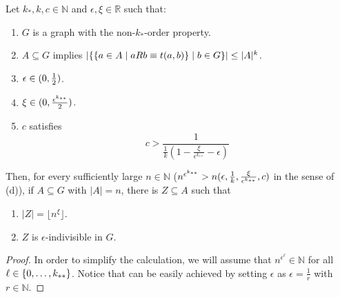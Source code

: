     \begin{lemma}[Claim 4.21] \label{lem:many_values_to_equitative_partition_with_bound_exceptional_pairs}
        Let $k_*, k, c \in \mathbb{N}$ and $\epsilon, \xi \in \mathbb{R}$ such that:
        \begin{enumerate}
            \item\label{itm:many_values_to_equitative_partition_with_bound_exceptional_pairs.1} $G$ is a graph with the non-$k_*$-order property.
            \item\label{itm:many_values_to_equitative_partition_with_bound_exceptional_pairs.2} $A \subseteq G$ implies $| \{ \{  a \in A \mid a R b \equiv t(a,b) \} \mid b \in G \} |
                \leq |A|^k$.
            \item\label{itm:many_values_to_equitative_partition_with_bound_exceptional_pairs.3} $\epsilon \in ( 0, \frac{1}{2} )$.
            \item\label{itm:many_values_to_equitative_partition_with_bound_exceptional_pairs.4} $\xi \in ( 0, \frac{\epsilon^{k_{**}}}{2} )$.
            \item\label{itm:many_values_to_equitative_partition_with_bound_exceptional_pairs.5} $c$ satisfies \[
                c > \frac{1}{\frac{1}{k} (1 - \frac{\xi}{\epsilon^{k_{**}}} - \epsilon)}
            \]
        \end{enumerate}
        Then, for every sufficiently large $n \in \mathbb{N}$ ($n^{\epsilon^{k_{**}}} > n( \epsilon, \frac{1}{k},
        \frac{\xi}{\epsilon^{k_{**}}}, c )$ in the sense of  (d)), if
        $A \subseteq G$ with $|A| = n$, there is $Z \subseteq A$ such that
        \begin{enumerate}[label=(\alph*), ref=\alph*]
            \item\label{itm:many_values_to_equitative_partition_with_bound_exceptional_pairs.a} $|Z| = \lfloor n^\xi \rfloor$.
            \item\label{itm:many_values_to_equitative_partition_with_bound_exceptional_pairs.b} $Z$ is $\epsilon$-indivisible in $G$.
        \end{enumerate}
        \begin{proof}
            In order to simplify the calculation, we will assume that $n^{\epsilon^\ell} \in \mathbb{N}$ for all
            $\ell \in \{ 0, \dots, k_{**} \}$.
            Notice that can be easily achieved by setting $\epsilon$ as $\epsilon = \frac{1}{r}$ with $r \in \mathbb{N}$.

\end{proof}
\end{lemma}

